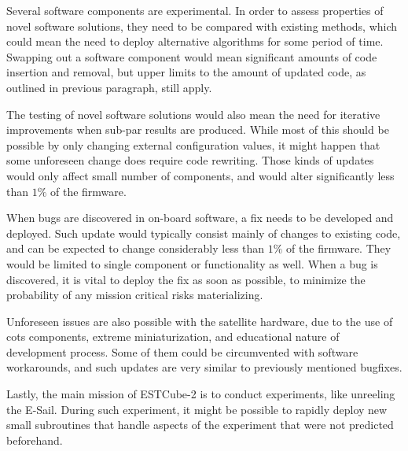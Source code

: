 Several software components are experimental. In order to assess properties of novel software solutions, they need to be compared with existing methods, which could mean the need to deploy alternative algorithms for some period of time. Swapping out a software component would mean significant amounts of code insertion and removal, but upper limits to the amount of updated code, as outlined in previous paragraph, still apply.

The testing of novel software solutions would also mean the need for iterative improvements when sub-par results are produced. While most of this should be possible by only changing external configuration values, it might happen that some unforeseen change does require code rewriting. Those kinds of updates would only affect small number of components, and would alter significantly less than $1\%$ of the firmware.

When bugs are discovered in on-board software, a fix needs to be developed and deployed. Such update would typically consist mainly of changes to existing code, and can be expected to change considerably less than $1\%$ of the firmware. They would be limited to single component or functionality as well. When a bug is discovered, it is vital to deploy the fix as soon as possible, to minimize the probability of any mission critical risks materializing.

Unforeseen issues are also possible with the satellite hardware, due to the use of \gls{cots} components, extreme miniaturization, and educational nature of development process. Some of them could be circumvented with software workarounds, and such updates are very similar to previously mentioned bugfixes.

Lastly, the main mission of ESTCube-2 is to conduct experiments, like unreeling the E-Sail. During such experiment, it might be possible to rapidly deploy new small subroutines that handle aspects of the experiment that were not predicted beforehand.